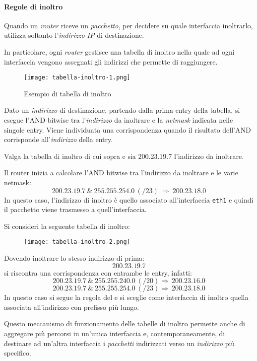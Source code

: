 \paragraph{Regole di inoltro}
Quando un \emph{router} riceve un \emph{pacchetto}, per decidere su quale
interfaccia inoltrarlo, utilizza soltanto l'\emph{indirizzo IP} di destinazione.

In particolare, ogni \emph{router} gestisce una tabella di inoltro nella quale
ad ogni interfaccia vengono assegnati gli indirizzi che permette di raggiungere.

\begin{figure}[h!]
    \centering
    \texttt{[image: tabella-inoltro-1.png]}
    \caption{Esempio di tabella di inoltro}
\end{figure}\noindent
Dato un \emph{indirizzo} di destinazione, partendo dalla prima entry della
tabella, si esegue l'AND bitwise tra l'\emph{indirizzo} da inoltrare e la
\emph{netmask} indicata nelle singole entry. Viene individuata una corrispondenza
quando il risultato dell'AND corrisponde all'\emph{indirizzo} della entry.

\begin{eg}
    Valga la tabella di inoltro di cui sopra e sia $200.23.19.7$ l'indirizzo da
    inoltrare.

    \noindent
    Il router inizia a calcolare l'AND bitwise tra l'indirizzo da inoltrare e le
    varie netmask:
    \[200.23.19.7\ \&\ 255.255.254.0\ (/23)\ \Rightarrow\ 200.23.18.0\]
    In questo caso, l'indirizzo di inoltro è quello associato all'interfaccia
    \texttt{eth1} e quindi il pacchetto viene trasmesso a quell'interfaccia.
\end{eg}

\begin{eg}
    Si consideri la seguente tabella di inoltro:
    \begin{figure}[h!]
        \centering
        \texttt{[image: tabella-inoltro-2.png]}
    \end{figure}

    \noindent Dovendo inoltrare lo stesso indirizzo di prima:
    \[200.23.19.7\]
    si riscontra una corrispondenza con entrambe le entry, infatti:
    \[200.23.19.7\ \&\ 255.255.240.0\ (/20)\Rightarrow\ 200.23.16.0\]
    \[200.23.19.7\ \&\ 255.255.254.0\ (/23)\Rightarrow\ 200.23.18.0\]
    In questo caso si segue la regola del  e si
    sceglie come interfaccia di inoltro quella associata all'indirizzo con
    prefisso più lungo.
\end{eg}\noindent
Questo meccanismo di funzionamento delle tabelle di inoltro permette anche di
aggregare più percorsi in un'unica interfaccia e, contemporaneamente, di destinare
ad un'altra interfaccia i \emph{pacchetti} indirizzati verso un \emph{indirizzo}
più specifico.


